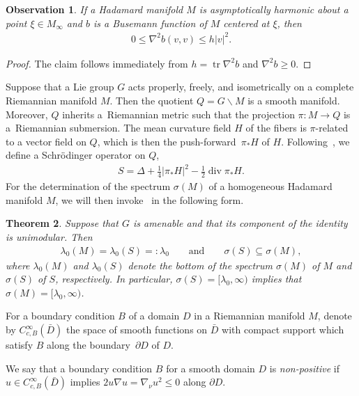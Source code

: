 \documentclass[10pt,a4paper]{amsart}
\numberwithin{equation}{section}
\newtheorem{Theorem}{Theorem}[section]
\newtheorem{obs}[Theorem]{Observation}
 { \theoremstyle{definition}
\newtheorem{Definition}[Theorem]{Definition}
\newtheorem{Note}[Theorem]{Note}
\newtheorem{Example}[Theorem]{Example}
\newtheorem{Remark}[Theorem]{Remark}
\newtheorem{exas}[Theorem]{Examples}
\newtheorem{exa}[Theorem]{Example}}
\DeclareMathOperator{\diver}{div}
\DeclareMathOperator{\tr}{tr}
\begin{document}
\begin{obs}\label{obs}
If a Hadamard manifold $M$ is asymptotically harmonic about a point $\xi\in M_\infty$
and $b$ is a Busemann function of $M$ centered at $\xi$, then
\begin{align*}
	0 \le \nabla^2b(v,v) \le h |v|^2.
\end{align*}
\end{obs}

\begin{proof}
The claim follows immediately from $h=\tr\nabla^2b$ and $\nabla^2b\ge0$.
\end{proof}

Suppose that a Lie group $G$ acts properly, freely, and isometrically on a complete Riemannian manifold $M$.
Then the quotient $Q=G\backslash M$ is a smooth manifold.
Moreover, $Q$ inherits a~Riemannian metric such that the projection $\pi\colon M\to Q$ is a~Riemannian submersion.
The mean curvature field $H$ of the fibers is $\pi$-related to a vector field on $Q$,
which is then the push-forward~$\pi_*H$ of $H$.
Following~\cite{P21}, we define a Schr\"odinger operator on $Q$,
\begin{align}\label{pdef}
	S = \Delta + \frac14|\pi_*H|^2 - \frac12\diver\pi_*H.
\end{align}
For the determination of the spectrum $\sigma(M)$ of a homogeneous Hadamard manifold $M$,
we will then invoke~\cite[Theorem 1.3]{P21} in the following form.

\begin{Theorem}\label{p13}
Suppose that $G$ is amenable and that its component of the identity is unimodular.
Then
\begin{align*}
	\lambda_0(M) = \lambda_0(S) =:\lambda_0
	\qquad \text{and} \qquad
	\sigma(S)\subseteq\sigma(M),
\end{align*}
where $\lambda_0(M)$ and $\lambda_0(S)$ denote the bottom of the spectrum $\sigma(M)$ of $M$
and $\sigma(S)$ of $S$, respectively.
In particular, $\sigma(S)=[\lambda_0,\infty)$ implies that $\sigma(M)=[\lambda_0,\infty)$.
\end{Theorem}

For a boundary condition $B$ of a domain $D$ in a Riemannian manifold $M$,
denote by $C^\infty_{c,B}(\bar{D})$ the space of smooth functions on $\bar D$ with compact support
which satisfy $B$ along the boundary~$\partial D$ of $D$.

\begin{Definition}%
We say that a boundary condition $B$ for a smooth domain $D$ is \emph{non-positive}
if~$u\in C^\infty_{c,B}(\bar D)$ implies $2u\nabla u=\nabla_\nu u^2\le0$ along $\partial D$.
\end{Definition}
\end{document}

